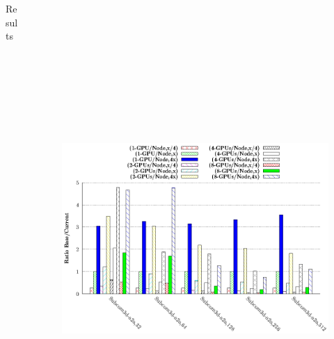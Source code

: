 \documentclass[final]{beamer}
\newlength{\onecolwid}
\newlength{\twocolwid}
\begin{document}
\begin{frame}[t]
\begin{columns}[t]
\begin{column}{\twocolwid}
\begin{columns}[t,totalwidth=\twocolwid]
\begin{column}{\onecolwid}
\begin{block}{Results}
\end{block}


\end{column} %

\begin{column}{\onecolwid} %
\vspace{-1em}



\begin{figure}
\centering
\begin{minipage}{1\textwidth}
\centering
\includegraphics[width=1\linewidth, height=18cm]{figs/dfly-bw-mapping-comm-subcom.eps}

\end{minipage}
\end{figure}
\end{column}
\end{columns}
\end{column}
\end{columns}
\end{frame}
\end{document}
